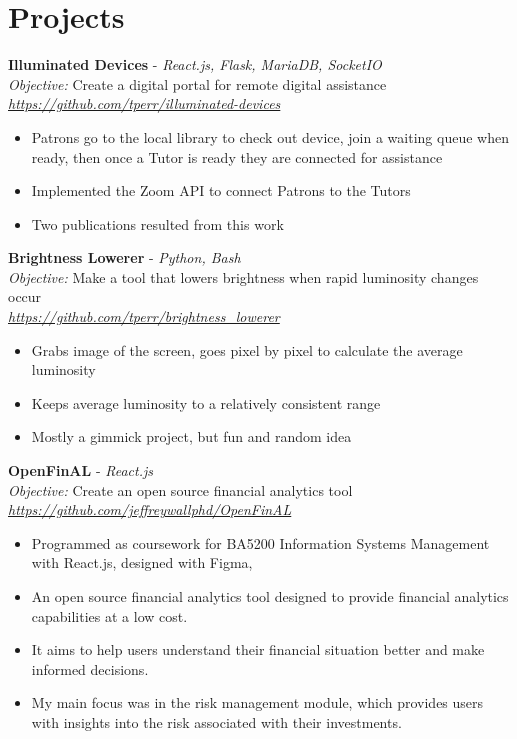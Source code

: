 \section*{Projects}
\textbf{Illuminated Devices} - \textit{React.js, Flask, MariaDB, SocketIO}\\
\textit{Objective:} Create a digital portal for remote digital assistance
\textit{\url{https://github.com/tperr/illuminated-devices}}
\begin{itemize}
    \item Patrons go to the local library to check out device, join a waiting queue when ready, then once a Tutor is ready they are connected for assistance
    \item Implemented the Zoom API to connect Patrons to the Tutors
    \item Two publications resulted from this work
\end{itemize}

\textbf{Brightness Lowerer} - \textit{Python, Bash}\\
\textit{Objective:} Make a tool that lowers brightness when rapid luminosity changes occur \\
\textit{\url{https://github.com/tperr/brightness_lowerer}}
\begin{itemize}
    \item Grabs image of the screen, goes pixel by pixel to calculate the average luminosity
    \item Keeps average luminosity to a relatively consistent range
    \item Mostly a gimmick project, but fun and random idea
\end{itemize}

\textbf{OpenFinAL} - \textit{React.js}\\
\textit{Objective:} Create an open source financial analytics tool \\
\textit{\url{https://github.com/jeffreywallphd/OpenFinAL}}
\begin{itemize}
    \item Programmed as coursework for BA5200 Information Systems Management with React.js, designed with Figma,
    \item An open source financial analytics tool designed to provide financial analytics capabilities at a low cost.
    \item It aims to help users understand their financial situation better and make informed decisions.
    \item My main focus was in the risk management module, which provides users with insights into the risk associated with their investments.
\end{itemize}